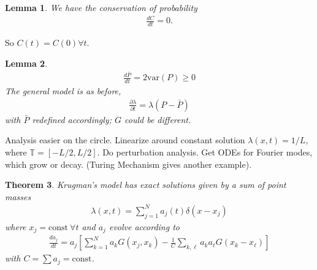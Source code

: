 \documentclass[12pt,reqno]{amsart}
\numberwithin{equation}{section}  %
\newcommand{\ci}{\mathbb{T}}
\newcommand{\p}{\partial}
\newtheorem{theorem}{Theorem}[section]
\newtheorem{lemma}[theorem]{Lemma}
\begin{document}
%
%
%
%
%
%
\begin{lemma}
    We have the conservation of probability
    \begin{equation*}
	\begin{split}
	    \frac{dC}{dt} =0.
	\end{split}
    \end{equation*}
    \label{lem:cons-prob}
\end{lemma}
%
%
So $C(t) = C(0) \forall t$. 
%
%
%
%
%
%
%                
%
%
%
%
\begin{lemma}
    \begin{equation*}
	\begin{split}
	    \frac{d \bar{P}}{dt} = 2 \text{var}(P) \ge 0
	\end{split}
    \end{equation*}
    The general model is as before, 
    \begin{equation*}
	\begin{split}
	    \frac{\p \lambda}{\p t} = \lambda (P - \bar{P}) 
	\end{split}
    \end{equation*}
    with $\bar{P}$ redefined accordingly; $G$ could be different.
    \label{lem:deriv-barP}
\end{lemma}
%
%
Analysis easier on the circle. Linearize around constant solution
$\lambda(x,t) = 1/L$, where $\ci = [-L/2, L/2]$. Do perturbation analysis.
Get ODEs for Fourier modes, which grow or decay. (Turing Mechanism gives another
example).
%
%
%
%
%
%
%
%
%
%
\begin{theorem}
    Krugman's model has exact solutions given by a sum of point masses
    \begin{equation*}
	\begin{split}
	    \lambda(x,t) = \sum_{j=1}^{N} a_{j}(t) \delta(x - x_{j})
	\end{split}
    \end{equation*}
    where $x_{j} = \text{const} \ \forall t$ and $a_{j}$ evolve according to 
    \begin{equation*}
	\begin{split}
	    \frac{d a_{j}}{dt} = a_{j}\left[ \sum_{k=1}^{N} a_{k} G(x_{j}, x_{k}) -
		\frac{1}{C} \sum_{k, \ell} a_{k}a_{\ell} G(x_{k} - x_{\ell}) \right] 
	\end{split}
    \end{equation*}
    with $C = \sum a_{j} = \text{const}$.
    \label{thm:main-theorem}
\end{theorem}
\end{document}

